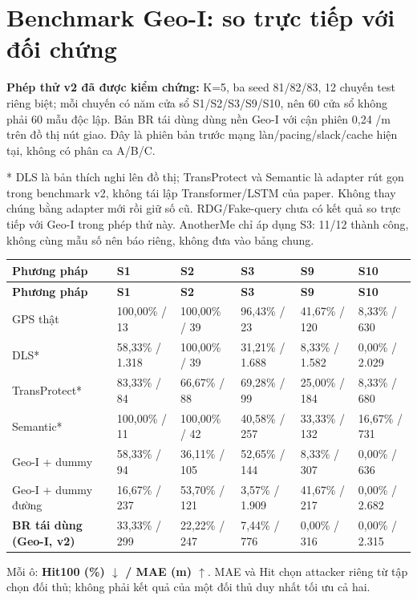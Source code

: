 \section{Benchmark Geo-I: so trực tiếp với đối chứng}
\textbf{Phép thử v2 đã được kiểm chứng:} K=5, ba seed 81/82/83, 12 chuyến test riêng biệt; mỗi chuyến có năm cửa sổ S1/S2/S3/S9/S10, nên 60 cửa sổ không phải 60 mẫu độc lập. Bản BR tái dùng dùng nền Geo-I với cận phiên 0,24 /m trên đồ thị nút giao. Đây là phiên bản trước mạng làn/pacing/slack/cache hiện tại, không có phân ca A/B/C.

* DLS là bản thích nghi lên đồ thị; TransProtect và Semantic là adapter rút gọn trong benchmark v2, không tái lập Transformer/LSTM của paper. Không thay chúng bằng adapter mới rồi giữ số cũ. RDG/Fake-query chưa có kết quả so trực tiếp với Geo-I trong phép thử này. AnotherMe chỉ áp dụng S3: 11/12 thành công, không cùng mẫu số nên báo riêng, không đưa vào bảng chung.

\begingroup\small
\begin{longtable}{@{}P{3.364cm}P{2.486cm}P{2.486cm}P{2.486cm}P{2.486cm}P{2.486cm}@{}}
\toprule
\textbf{Phương pháp} & \textbf{S1} & \textbf{S2} & \textbf{S3} & \textbf{S9} & \textbf{S10}\\\midrule
\endfirsthead
\toprule
\textbf{Phương pháp} & \textbf{S1} & \textbf{S2} & \textbf{S3} & \textbf{S9} & \textbf{S10}\\\midrule
\endhead
\bottomrule\endfoot
GPS thật & 100,00\% / 13 & 100,00\% / 39 & 96,43\% / 23 & 41,67\% / 120 & 8,33\% / 630\\
\addlinespace[3pt]
DLS* & 58,33\% / 1.318 & 100,00\% / 39 & 31,21\% / 1.688 & 8,33\% / 1.582 & 0,00\% / 2.029\\
\addlinespace[3pt]
TransProtect* & 83,33\% / 84 & 66,67\% / 88 & 69,28\% / 99 & 25,00\% / 184 & 8,33\% / 680\\
\addlinespace[3pt]
Semantic* & 100,00\% / 11 & 100,00\% / 42 & 40,58\% / 257 & 33,33\% / 132 & 16,67\% / 731\\
\addlinespace[3pt]
Geo-I + dummy & 58,33\% / 94 & 36,11\% / 105 & 52,65\% / 144 & 8,33\% / 307 & 0,00\% / 636\\
\addlinespace[3pt]
Geo-I + dummy đường & 16,67\% / 237 & 53,70\% / 121 & 3,57\% / 1.909 & 41,67\% / 217 & 0,00\% / 2.682\\
\addlinespace[3pt]
\textbf{BR tái dùng (Geo-I, v2)} & 33,33\% / 299 & 22,22\% / 247 & 7,44\% / 776 & 0,00\% / 316 & 0,00\% / 2.315\\
\end{longtable}
\endgroup
Mỗi ô: \textbf{Hit100 (\%) $\downarrow$ / MAE (m) $\uparrow$}. MAE và Hit chọn attacker riêng từ tập chọn đối thủ; không phải kết quả của một đối thủ duy nhất tối ưu cả hai.

